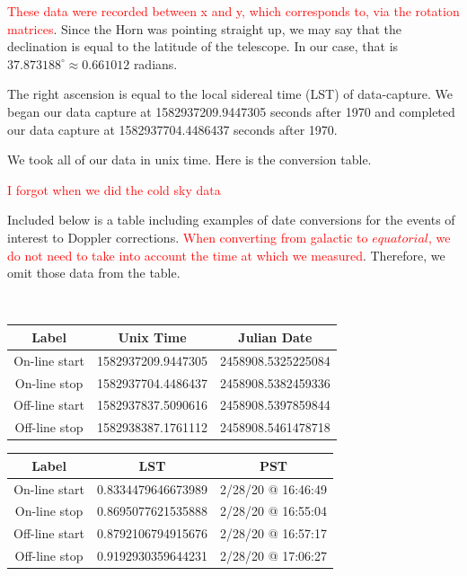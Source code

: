 \documentclass[12pt]{article}
\begin{document}
\textcolor{red}{These data were recorded between x and y, which corresponds to, via the rotation matrices}. Since the Horn was pointing straight up, we may say that the declination is equal to the latitude of the telescope. In our case, that is $37.873188^\circ \approx 0.661012$ radians.

The right ascension is equal to the local sidereal time (LST) of data-capture. We began our data capture at 1582937209.9447305 seconds after 1970 and completed our data capture at 1582937704.4486437 seconds after 1970.

We took all of our data in unix time. Here is the conversion table.

\textcolor{red}{I forgot when we did the cold sky data}

Included below is a table including examples of date conversions for the events of interest to Doppler corrections. \textcolor{red}{When converting from galactic to $equatorial$, we do not need to take into account the time at which we measured}. Therefore, we omit those data from the table. %

\

\begin{center}
 \begin{tabular}{||c c c||} 
 \hline
 Label & Unix Time & Julian Date \\ [0.5ex] 
 \hline\hline
 On-line start & 1582937209.9447305 & 2458908.5325225084 \\ 
 \hline
 On-line stop & 1582937704.4486437 & 2458908.5382459336 \\
 \hline
 Off-line start & 1582937837.5090616 & 2458908.5397859844 \\
 \hline
 Off-line stop & 1582938387.1761112 & 2458908.5461478718 \\ [1ex] 
 \hline
\end{tabular}
\end{center}

\begin{center}
 \begin{tabular}{||c c c||} 
 \hline
 Label & LST & PST\\ [0.5ex] 
 \hline\hline
 On-line start & 0.8334479646673989 & 2/28/20 @ 16:46:49 \\ 
 \hline
 On-line stop & 0.8695077621535888 & 2/28/20 @ 16:55:04 \\
 \hline
 Off-line start & 0.8792106794915676 & 2/28/20 @ 16:57:17 \\
 \hline
 Off-line stop & 0.9192930359644231 & 2/28/20 @ 17:06:27 \\ [1ex] 
 \hline
\end{tabular}
\end{center}
\end{document}
